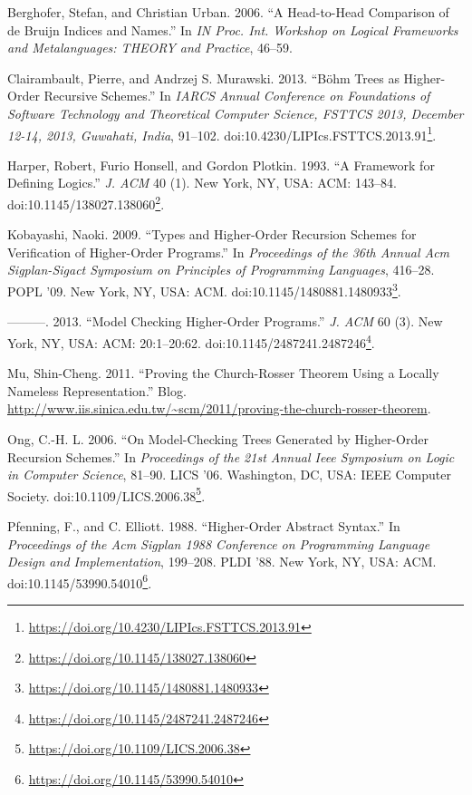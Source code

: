 \documentclass[a4paper, 12pt, twoside]{style/ociamthesis}
\theoremstyle{plain}
\theoremstyle{definition}
\theoremstyle{remark}
\renewcommand{\href}[2]{#2\footnote{\url{#1}}}
\begin{document}
\hypertarget{ref-berghofer06}{}
Berghofer, Stefan, and Christian Urban. 2006. ``A Head-to-Head
Comparison of de Bruijn Indices and Names.'' In \emph{IN Proc. Int.
Workshop on Logical Frameworks and Metalanguages: THEORY and Practice},
46--59.

\hypertarget{ref-clairambault13}{}
Clairambault, Pierre, and Andrzej S. Murawski. 2013. ``Böhm Trees as
Higher-Order Recursive Schemes.'' In \emph{IARCS Annual Conference on
Foundations of Software Technology and Theoretical Computer Science,
FSTTCS 2013, December 12-14, 2013, Guwahati, India}, 91--102.
doi:\href{https://doi.org/10.4230/LIPIcs.FSTTCS.2013.91}{10.4230/LIPIcs.FSTTCS.2013.91}.

\hypertarget{ref-harper93}{}
Harper, Robert, Furio Honsell, and Gordon Plotkin. 1993. ``A Framework
for Defining Logics.'' \emph{J. ACM} 40 (1). New York, NY, USA: ACM:
143--84.
doi:\href{https://doi.org/10.1145/138027.138060}{10.1145/138027.138060}.

\hypertarget{ref-kobayashi09}{}
Kobayashi, Naoki. 2009. ``Types and Higher-Order Recursion Schemes for
Verification of Higher-Order Programs.'' In \emph{Proceedings of the
36th Annual Acm Sigplan-Sigact Symposium on Principles of Programming
Languages}, 416--28. POPL '09. New York, NY, USA: ACM.
doi:\href{https://doi.org/10.1145/1480881.1480933}{10.1145/1480881.1480933}.

\hypertarget{ref-kobayashi13}{}
---------. 2013. ``Model Checking Higher-Order Programs.'' \emph{J. ACM}
60 (3). New York, NY, USA: ACM: 20:1--20:62.
doi:\href{https://doi.org/10.1145/2487241.2487246}{10.1145/2487241.2487246}.

\hypertarget{ref-shing-cheng}{}
Mu, Shin-Cheng. 2011. ``Proving the Church-Rosser Theorem Using a
Locally Nameless Representation.'' Blog.
\url{http://www.iis.sinica.edu.tw/~scm/2011/proving-the-church-rosser-theorem}.

\hypertarget{ref-ong06}{}
Ong, C.-H. L. 2006. ``On Model-Checking Trees Generated by Higher-Order
Recursion Schemes.'' In \emph{Proceedings of the 21st Annual Ieee
Symposium on Logic in Computer Science}, 81--90. LICS '06. Washington,
DC, USA: IEEE Computer Society.
doi:\href{https://doi.org/10.1109/LICS.2006.38}{10.1109/LICS.2006.38}.

\hypertarget{ref-pfenning88}{}
Pfenning, F., and C. Elliott. 1988. ``Higher-Order Abstract Syntax.'' In
\emph{Proceedings of the Acm Sigplan 1988 Conference on Programming
Language Design and Implementation}, 199--208. PLDI '88. New York, NY,
USA: ACM.
doi:\href{https://doi.org/10.1145/53990.54010}{10.1145/53990.54010}.
\end{document}
